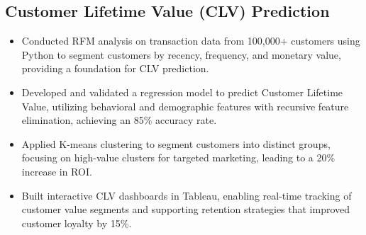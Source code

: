 \documentclass[12pt,a4paper]{article}
\begin{document}
\subsection*{Customer Lifetime Value (CLV) Prediction}
\begin{itemize}[leftmargin=*,noitemsep,topsep=0pt]
\item Conducted RFM analysis on transaction data from 100,000+ customers using Python to segment customers by recency, frequency, and monetary value, providing a foundation for CLV prediction.
\item Developed and validated a regression model to predict Customer Lifetime Value, utilizing behavioral and demographic features with recursive feature elimination, achieving an 85\% accuracy rate.
\item Applied K-means clustering to segment customers into distinct groups, focusing on high-value clusters for targeted marketing, leading to a 20\% increase in ROI.
\item Built interactive CLV dashboards in Tableau, enabling real-time tracking of customer value segments and supporting retention strategies that improved customer loyalty by 15\%.
\end{itemize}
\end{document}
